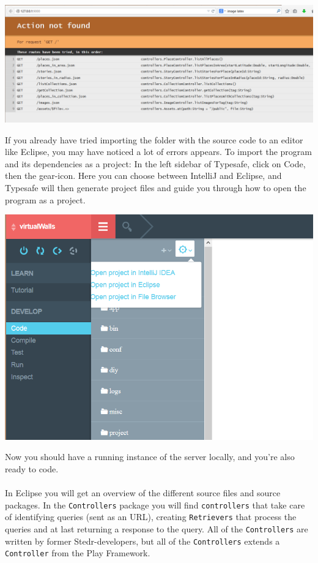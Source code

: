 \begin{center}
\includegraphics[scale=0.5]{guide/activator3.png} 
\end{center}

If you already have tried importing the folder with the source code to an editor like Eclipse, you may have noticed a lot of errors appears. To import the program and its dependencies as a project: In the left sidebar of Typesafe, click on Code, then the gear-icon. Here you can choose between IntelliJ and Eclipse, and Typesafe will then generate project files and guide you through how to open the program as a project. 
\begin{center}
\includegraphics[scale=0.6]{guide/activator4.png} 
\end{center}
Now you should have a running instance of the server locally, and you're also ready to code. 

\paragraph{}

In Eclipse you will get an overview of the different source files and source packages. In the \texttt{Controllers} package you will find \texttt{controllers} that take care of identifying queries (sent as an URL), creating \texttt{Retrievers} that process the queries and at last returning a response to the query. All of the  \texttt{Controllers} are written by former Stedr-developers, but all of the  \texttt{Controllers} extends a  \texttt{Controller} from the Play Framework.

